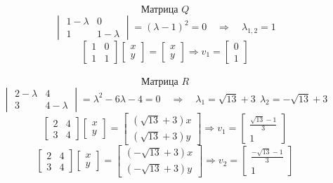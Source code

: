 \documentclass[a3paper,14pt]{extarticle}
\begin{document}
$$\text{Матрица } Q$$
$$\begin{vmatrix}
    1-\lambda & 0 \\ 1 & 1-\lambda
\end{vmatrix} = (\lambda - 1)^2 = 0 \quad\Rightarrow\quad \lambda_{1,2}=1$$%
$$\begin{bmatrix}
    1 & 0 \\ 1 & 1
\end{bmatrix}\begin{bmatrix}
    x \\ y
\end{bmatrix} = \begin{bmatrix}
    x \\ y
\end{bmatrix} \Rightarrow v_1 = \begin{bmatrix}
    0 \\ 1
\end{bmatrix}$$\,\\[0.5em]
$$\text{Матрица } R$$
$$\begin{vmatrix}
    2-\lambda & 4 \\ 3 & 4-\lambda
\end{vmatrix} = \lambda^2-6\lambda-4 = 0 \quad\Rightarrow\quad \lambda_1=\sqrt{13}+3\ \ \lambda_2=-\sqrt{13}+3$$
$$\begin{bmatrix}
    2 & 4 \\ 3 & 4
\end{bmatrix}\begin{bmatrix}
    x \\ y
\end{bmatrix} = \begin{bmatrix}
    (\sqrt{13}+3)x \\ (\sqrt{13}+3)y
\end{bmatrix} \Rightarrow v_1 = \begin{bmatrix}
    \frac{\sqrt{13}-1}{3} \\ 1
\end{bmatrix}$$
$$\begin{bmatrix}
    2 & 4 \\ 3 & 4
\end{bmatrix}\begin{bmatrix}
    x \\ y
\end{bmatrix} = \begin{bmatrix}
    (-\sqrt{13}+3)x \\ (-\sqrt{13}+3)y
\end{bmatrix} \Rightarrow v_2 = \begin{bmatrix}
    \frac{-\sqrt{13}-1}{3} \\ 1
\end{bmatrix}$$\,\\[0.5em]
\end{document}

